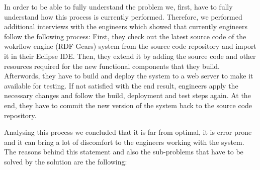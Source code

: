 In order to be able to fully understand the problem we, first, have to fully understand how this process is currently performed. Therefore, we performed additional interviews with the engineers which showed that currently engineers follow the following process: First, they check out the latest source code of the wokrflow engine (RDF Gears) system from the source code repository and import it in their Eclipse IDE. Then, they extend it by adding the source code and other resources required for the new functional components that they build. Afterwords, they have to build and deploy the system to a web server to make it available for testing. If not satisfied with the end result, engineers apply the necessary changes and follow the build, deployment and test steps again. At the end, they have to commit the new version of the system back to the source code repository.

Analysing this process we concluded that it is far from optimal, it is error prone and it can bring a lot of discomfort to the engineers working with the system. The reasons behind this statement and also the sub-problems that have to be solved by the solution are the following:

